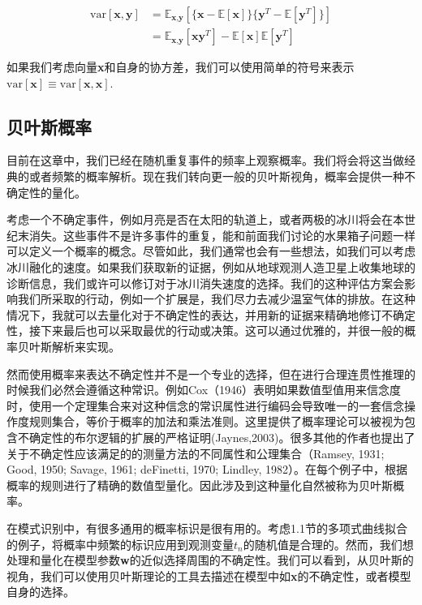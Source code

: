 	\begin{equation}
	\begin{aligned}
	\mathrm{var}[\textbf{x}, \textbf{y}] & = \mathbb{E}_{\textbf{x},\textbf{y}}[\{\textbf{x} - \mathbb{E}[\textbf{x}]\}\{ \textbf{y}^T - \mathbb{E}[\textbf{y}^T] \}]\\
	& = \mathbb{E}_{\textbf{x},\textbf{y}}[\textbf{xy}^T] - \mathbb{E}[\textbf{x}] \mathbb{E}[\textbf{y}^T]
	\end{aligned}
	\end{equation}
	
	如果我们考虑向量\textbf{x}和自身的协方差，我们可以使用简单的符号来表示$\mathrm{var}[\textbf{x}] \equiv \mathrm{var}[\textbf{x},\textbf{x}]$.
	
\subsection{贝叶斯概率}
	 目前在这章中，我们已经在随机重复事件的频率上观察概率。我们将会将这当做经典的或者频繁的概率解析。现在我们转向更一般的贝叶斯视角，概率会提供一种不确定性的量化。
	 
	 考虑一个不确定事件，例如月亮是否在太阳的轨道上，或者两极的冰川将会在本世纪末消失。这些事件不是许多事件的重复，能和前面我们讨论的水果箱子问题一样可以定义一个概率的概念。尽管如此，我们通常也会有一些想法，如我们可以考虑冰川融化的速度。如果我们获取新的证据，例如从地球观测人造卫星上收集地球的诊断信息，我们或许可以修订对于冰川消失速度的选择。我们的这种评估方案会影响我们所采取的行动，例如一个扩展是，我们尽力去减少温室气体的排放。在这种情况下，我就可以去量化对于不确定性的表达，并用新的证据来精确地修订不确定性，接下来最后也可以采取最优的行动或决策。这可以通过优雅的，并很一般的概率贝叶斯解析来实现。
	 
	 然而使用概率来表达不确定性并不是一个专业的选择，但在进行合理连贯性推理的时候我们必然会遵循这种常识。例如Cox（1946）表明如果数值型值用来信念度时，使用一个定理集合来对这种信念的常识属性进行编码会导致唯一的一套信念操作度规则集合，等价于概率的加法和乘法准则。这里提供了概率理论可以被视为包含不确定性的布尔逻辑的扩展的严格证明(Jaynes,2003)。很多其他的作者也提出了关于不确定性应该满足的的测量方法的不同属性和公理集合（Ramsey, 1931; Good, 1950; Savage, 1961; deFinetti, 1970; Lindley, 1982）。在每个例子中，根据概率的规则进行了精确的数值型量化。因此涉及到这种量化自然被称为贝叶斯概率。
	 
	 在模式识别中，有很多通用的概率标识是很有用的。考虑1.1节的多项式曲线拟合的例子，将概率中频繁的标识应用到观测变量$t_n$的随机值是合理的。然而，我们想处理和量化在模型参数\textbf{w}的近似选择周围的不确定性。我们可以看到，从贝叶斯的视角，我们可以使用贝叶斯理论的工具去描述在模型中如\textbf{x}的不确定性，或者模型自身的选择。
	 

